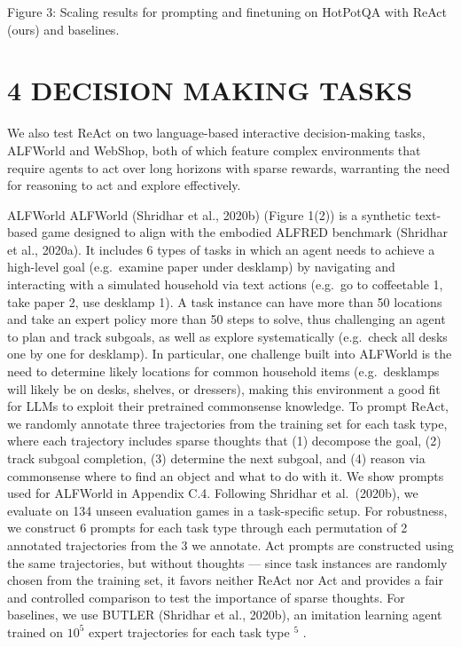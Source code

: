 \documentclass[
]{article}
\begin{document}
Figure 3: Scaling results for prompting and finetuning on HotPotQA with
ReAct (ours) and baselines.

\section{4 DECISION MAKING TASKS}\label{decision-making-tasks}

We also test ReAct on two language-based interactive decision-making
tasks, ALFWorld and WebShop, both of which feature complex environments
that require agents to act over long horizons with sparse rewards,
warranting the need for reasoning to act and explore effectively.

ALFWorld ALFWorld (Shridhar et al., 2020b) (Figure 1(2)) is a synthetic
text-based game designed to align with the embodied ALFRED benchmark
(Shridhar et al., 2020a). It includes 6 types of tasks in which an agent
needs to achieve a high-level goal (e.g.~examine paper under desklamp)
by navigating and interacting with a simulated household via text
actions (e.g.~go to coffeetable 1, take paper 2, use desklamp 1). A task
instance can have more than 50 locations and take an expert policy more
than 50 steps to solve, thus challenging an agent to plan and track
subgoals, as well as explore systematically (e.g.~check all desks one by
one for desklamp). In particular, one challenge built into ALFWorld is
the need to determine likely locations for common household items
(e.g.~desklamps will likely be on desks, shelves, or dressers), making
this environment a good fit for LLMs to exploit their pretrained
commonsense knowledge. To prompt ReAct, we randomly annotate three
trajectories from the training set for each task type, where each
trajectory includes sparse thoughts that (1) decompose the goal, (2)
track subgoal completion, (3) determine the next subgoal, and (4) reason
via commonsense where to find an object and what to do with it. We show
prompts used for ALFWorld in Appendix C.4. Following Shridhar et
al.~(2020b), we evaluate on 134 unseen evaluation games in a
task-specific setup. For robustness, we construct 6 prompts for each
task type through each permutation of 2 annotated trajectories from the
3 we annotate. Act prompts are constructed using the same trajectories,
but without thoughts --- since task instances are randomly chosen from
the training set, it favors neither ReAct nor Act and provides a fair
and controlled comparison to test the importance of sparse thoughts. For
baselines, we use BUTLER (Shridhar et al., 2020b), an imitation learning
agent trained on \(10^{5}\) expert trajectories for each task type
\(^{5}\) .
\end{document}
